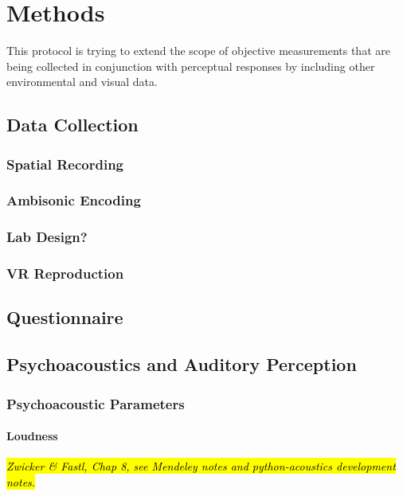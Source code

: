 \chapter{Methods}
\label{ch:methods}

This protocol is trying to extend the scope of objective measurements that are being collected in conjunction with perceptual responses by including other environmental and visual data.

\section{Data Collection}

  \subsection{Spatial Recording}

  \subsection{Ambisonic Encoding}

  \subsection{Lab Design?}

  \subsection{VR Reproduction}

\section{Questionnaire}

\section{Psychoacoustics and Auditory Perception}

  \subsection{Psychoacoustic Parameters}

  \subsubsection{Loudness}
    \emph{\hl{Zwicker \& Fastl, Chap 8, see Mendeley notes and python-acoustics development notes.}}

